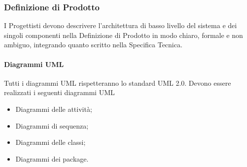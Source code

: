 \subsubsection{Definizione di Prodotto}
\label{}
I Progettisti devono descrivere l'architettura di basso livello del sistema e dei singoli componenti nella Definizione di Prodotto in modo chiaro, formale e non ambiguo, integrando quanto scritto nella Specifica Tecnica.

\paragraph{Diagrammi UML \\}
\label{}
Tutti i diagrammi UML rispetteranno lo standard UML 2.0.
Devono essere realizzati i seguenti diagrammi UML
\begin{itemize}
\item Diagrammi delle attività;
\item Diagrammi di sequenza;
\item Diagrammi delle classi;
\item Diagrammi dei package.
\end{itemize}


